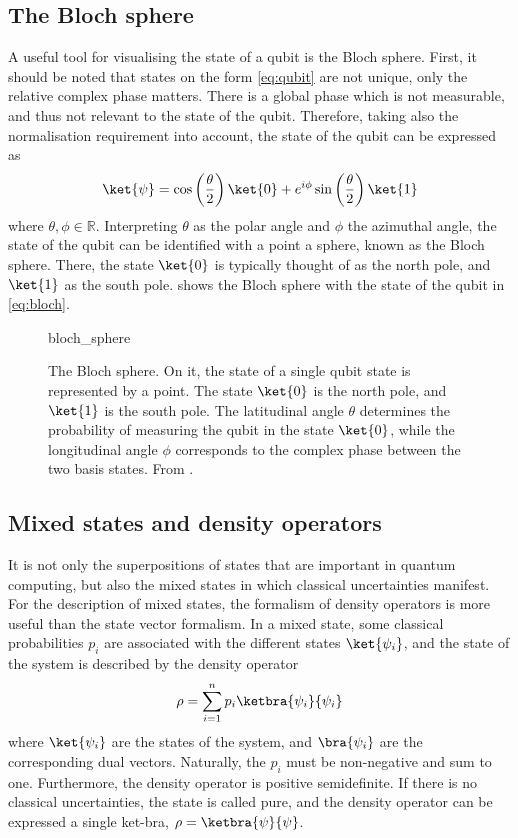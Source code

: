 \subsection{The Bloch sphere}
A useful tool for visualising the state of a qubit is the Bloch sphere.
First, it should be noted that states on the form \cref{eq:qubit} are not unique, only the relative complex phase matters.
There is a global phase which is not measurable, and thus not relevant to the state of the qubit.
Therefore, taking also the normalisation requirement into account, the state of the qubit can be expressed as
\begin{equation}
    \ket{\psi} = \cos\left(\frac{\theta}{2}\right) \ket{0} + e^{i\phi} \sin\left(\frac{\theta}{2}\right) \ket{1}
    \label{eq:bloch}
\end{equation}
where $\theta, \phi \in \mathbb{R}$.
Interpreting $\theta$ as the polar angle and $\phi$ the azimuthal angle, the state of the qubit can be identified with a point a sphere, known as the Bloch sphere.
There, the state $\ket{0}$ is typically thought of as the north pole, and $\ket{1}$ as the south pole.
 shows the Bloch sphere with the state of the qubit in \cref{eq:bloch}.

\begin{figure}
    \centering
    \def\svgwidth{0.4\textwidth}
    {bloch_sphere}
    \caption{
        The Bloch sphere.
        On it, the state of a single qubit state is represented by a point.
        The state $\ket{0}$ is the north pole, and $\ket{1}$ is the south pole.
        The latitudinal angle $\theta$ determines the probability of measuring the qubit in the state $\ket{0}$, while the longitudinal angle $\phi$ corresponds to the complex phase between the two basis states.
        From \cite{wikipedia_bloch}.
    }
    \label{fig:bloch}
\end{figure}

\subsection{Mixed states and density operators}
It is not only the superpositions of states that are important in quantum computing, but also the mixed states in which classical uncertainties manifest.
For the description of mixed states, the formalism of density operators is more useful than the state vector formalism.
In a mixed state, some classical probabilities $p_i$ are associated with the different states $\ket{\psi_i}$, and the state of the system is described by the density operator
\begin{equation}
    \rho = \sum_{i=1}^n p_i \ketbra{\psi_i}{\psi_i}
    \label{eq:density}
\end{equation}
where $\ket{\psi_i}$ are the states of the system, and $\bra{\psi_i}$ are the corresponding dual vectors.
Naturally, the $p_i$ must be non-negative and sum to one.
Furthermore, the density operator is positive semidefinite.
If there is no classical uncertainties, the state is called pure, and the density operator can be expressed a single ket-bra, $\rho = \ketbra{\psi}{\psi}$.

